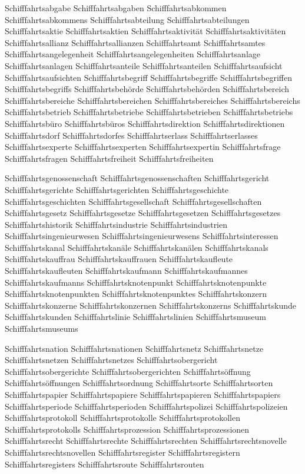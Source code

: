 Schifffahrtsabgabe
Schifffahrtsabgaben
Schifffahrtsabkommen
Schifffahrtsabkommens
Schifffahrtsabteilung
Schifffahrtsabteilungen
Schifffahrtsaktie
Schifffahrtsaktien
Schifffahrtsaktivität
Schifffahrtsaktivitäten
Schifffahrtsallianz
Schifffahrtsallianzen
Schifffahrtsamt
Schifffahrtsamtes
Schifffahrtsangelegenheit
Schifffahrtsangelegenheiten
Schifffahrtsanlage
Schifffahrtsanlagen
Schifffahrtsanteile
Schifffahrtsanteilen
Schifffahrtsaufsicht
Schifffahrtsaufsichten
Schifffahrtsbegriff
Schifffahrtsbegriffe
Schifffahrtsbegriffen
Schifffahrtsbegriffs
Schifffahrtsbehörde
Schifffahrtsbehörden
Schifffahrtsbereich
Schifffahrtsbereiche
Schifffahrtsbereichen
Schifffahrtsbereiches
Schifffahrtsbereichs
Schifffahrtsbetrieb
Schifffahrtsbetriebe
Schifffahrtsbetrieben
Schifffahrtsbetriebs
Schifffahrtsbüro
Schifffahrtsbüros
Schifffahrtsdirektion
Schifffahrtsdirektionen
Schifffahrtsdorf
Schifffahrtsdorfes
Schifffahrtserlass
Schifffahrtserlasses
Schifffahrtsexperte
Schifffahrtsexperten
Schifffahrtsexpertin
Schifffahrtsfrage
Schifffahrtsfragen
Schifffahrtsfreiheit
Schifffahrtsfreiheiten

Schifffahrtsgenossenschaft
Schifffahrtsgenossenschaften
Schifffahrtsgericht
Schifffahrtsgerichte
Schifffahrtsgerichten
Schifffahrtsgeschichte
Schifffahrtsgeschichten
Schifffahrtsgesellschaft
Schifffahrtsgesellschaften
Schifffahrtsgesetz
Schifffahrtsgesetze
Schifffahrtsgesetzen
Schifffahrtsgesetzes
Schifffahrtshistorik
Schifffahrtsindustrie
Schifffahrtsindustrien
Schifffahrtsingenieurwesen
Schifffahrtsingenieurwesens
Schifffahrtsinteressen
Schifffahrtskanal
Schifffahrtskanäle
Schifffahrtskanälen
Schifffahrtskanals
Schifffahrtskauffrau
Schifffahrtskauffrauen
Schifffahrtskaufleute
Schifffahrtskaufleuten
Schifffahrtskaufmann
Schifffahrtskaufmannes
Schifffahrtskaufmanns
Schifffahrtsknotenpunkt
Schifffahrtsknotenpunkte
Schifffahrtsknotenpunkten
Schifffahrtsknotenpunktes
Schifffahrtskonzern
Schifffahrtskonzerne
Schifffahrtskonzernen
Schifffahrtskonzerns
Schifffahrtskunde
Schifffahrtskunden
Schifffahrtslinie
Schifffahrtslinien
Schifffahrtsmuseum
Schifffahrtsmuseums

Schifffahrtsnation
Schifffahrtsnationen
Schifffahrtsnetz
Schifffahrtsnetze
Schifffahrtsnetzen
Schifffahrtsnetzes
Schifffahrtsobergericht
Schifffahrtsobergerichte
Schifffahrtsobergerichten
Schifffahrtsöffnung
Schifffahrtsöffnungen
Schifffahrtsordnung
Schifffahrtsorte
Schifffahrtsorten
Schifffahrtspapier
Schifffahrtspapiere
Schifffahrtspapieren
Schifffahrtspapiers
Schifffahrtsperiode
Schifffahrtsperioden
Schifffahrtspolizei
Schifffahrtspolizeien
Schifffahrtsprotokoll
Schifffahrtsprotokolle
Schifffahrtsprotokollen
Schifffahrtsprotokolls
Schifffahrtsprozession
Schifffahrtsprozessionen
Schifffahrtsrecht
Schifffahrtsrechte
Schifffahrtsrechten
Schifffahrtsrechtsnovelle
Schifffahrtsrechtsnovellen
Schifffahrtsregister
Schifffahrtsregistern
Schifffahrtsregisters
Schifffahrtsroute
Schifffahrtsrouten

